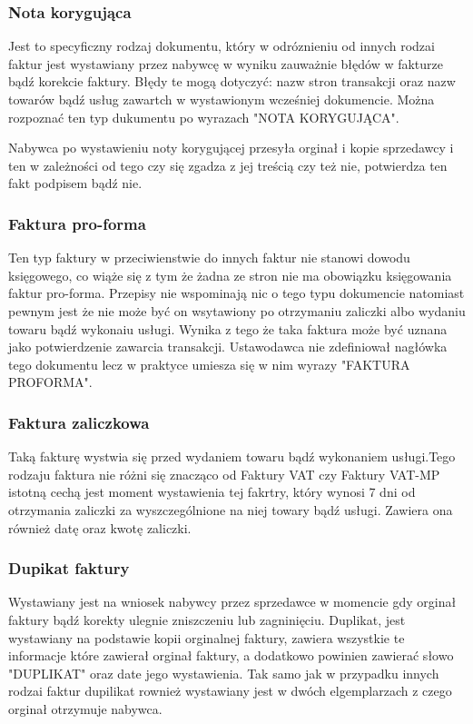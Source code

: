 \documentclass[12pt, a4paper]{article}
\begin{document}
\subsubsection{Nota korygująca}
Jest to specyficzny rodzaj dokumentu, który w odróznieniu od innych rodzai
faktur jest wystawiany przez nabywcę w wyniku zauważnie błędów w fakturze bądź
korekcie faktury. Błędy te mogą dotyczyć: nazw stron transakcji oraz nazw
towarów bądź usług zawartch w wystawionym wcześniej dokumencie. Można rozpoznać
ten typ dukumentu po wyrazach "NOTA KORYGUJĄCA".

Nabywca po wystawieniu noty korygującej przesyła orginał i kopie sprzedawcy i
ten w zależności od tego czy się zgadza z jej treścią czy też nie, potwierdza
ten fakt podpisem bądź nie.
\subsubsection{Faktura pro-forma}
Ten typ faktury w przeciwienstwie do innych faktur nie stanowi dowodu
księgowego, co wiąże się z tym że żadna ze stron nie ma obowiązku księgowania
faktur pro-forma. Przepisy nie wspominają nic o tego typu dokumencie natomiast
pewnym jest że nie może być on wsytawiony po otrzymaniu zaliczki albo wydaniu
towaru bądź wykonaiu usługi. Wynika z tego że taka faktura może być uznana jako
potwierdzenie zawarcia transakcji. Ustawodawca nie zdefiniował nagłówka tego
dokumentu lecz w praktyce umiesza się w nim wyrazy "FAKTURA PROFORMA".
\subsubsection{Faktura zaliczkowa}
Taką fakturę
wystwia się przed wydaniem towaru bądź wykonaniem usługi.Tego rodzaju faktura nie różni się znacząco od Faktury VAT czy Faktury VAT-MP
istotną cechą jest moment wystawienia tej fakrtry, który wynosi 7 dni od
otrzymania zaliczki za wyszczególnione na niej towary bądź usługi. Zawiera ona
również datę oraz kwotę zaliczki.
\subsubsection{Dupikat faktury}
Wystawiany jest na wniosek nabywcy przez sprzedawce w momencie gdy orginał
faktury bądź korekty ulegnie zniszczeniu lub zagninięciu. Duplikat, jest
wystawiany na podstawie kopii orginalnej faktury, zawiera wszystkie te
informacje które zawierał orginał faktury, a dodatkowo powinien zawierać słowo "DUPLIKAT" oraz date jego wystawienia. Tak samo jak w przypadku
innych rodzai faktur dupilikat rownież wystawiany jest w dwóch elgemplarzach z
czego orginał otrzymuje nabywca.
\end{document}

